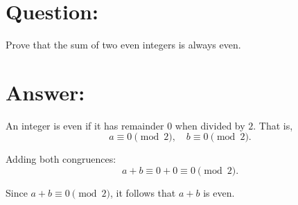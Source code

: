 \documentclass{article}
\begin{document}
\section{Question:}

Prove that the sum of two even integers is always even.

\section{Answer:}

An integer is even if it has remainder $0$ when divided by $2$. That is,
\begin{equation}
    a \equiv 0 \pmod{2}, \quad b \equiv 0 \pmod{2}.
\end{equation}

Adding both congruences:
\begin{equation}
    a + b \equiv 0 + 0 \equiv 0 \pmod{2}.
\end{equation}

Since $a + b \equiv 0 \pmod{2}$, it follows that $a + b$ is even.
\end{document}
